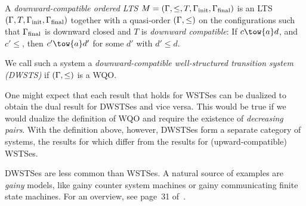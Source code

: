 \documentclass[../../diss.tex]{subfiles}
\begin{document}
A \emph{downward-compatible ordered LTS} $M = (\Gamma,\leq,T,\Gamma_{\text{init}},\Gamma_{\text{final}})$ is an LTS $(\Gamma,T,\Gamma_{\text{init}},\Gamma_{\text{final}})$ together with a quasi-order $(\Gamma,\leq)$ on the configurations such that $\Gamma_{\text{final}}$ is downward closed and $T$ is \emph{downward compatible}: If $c \tow{a} d$, and $c' \leq $, then $c' \tow{a} d'$ for some $d'$ with $d' \leq d$.

We call such a system a \emph{downward-compatible well-structured transition system (DWSTS)} if $(\Gamma,\leq)$ is a WQO.\@

One might expect that each result that holds for WSTSes can be dualized to obtain the dual result for DWSTSes and vice versa.
This would be true if we would dualize the definition of WQO and require the existence of \emph{decreasing pairs}.
With the definition above, however, DWSTSes form a separate category of systems, the results for which differ from the results for (upward-compatible) WSTSes.

DWSTSes are less common than WSTSes.
A natural source of examples are \emph{gainy} models,
like gainy counter system machines or gainy communicating finite state machines.
For an overview, see page~31 of~\cite{FinkelS01}.
\end{document}
